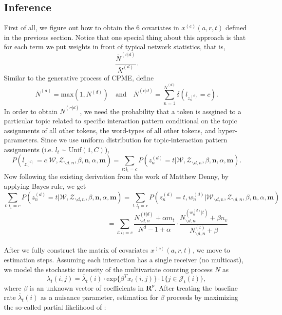 \documentclass[a4paper]{article}
\begin{document}
\subsection{Inference}
First of all, we figure out how to obtain the 6 covariates in $x^{(c)}(a, r, t)$ defined in the previous section. Notice that one special thing about this approach is that for each term we put weights in front of typical network statistics, that is, $$\frac{\bar N^{(c|d)}}{\bar N^{(d)}}.$$
Similar to the generative process of CPME, define $$\bar N^{(d)}=\mbox{max}(1, N^{(d)})\quad\mbox{and}\quad \bar N^{(c|d)}=\sum_{n=1}^{\bar N^{(d)}}\delta(l_{z_n^{(d)}}=c).$$
In order to obtain $\bar N^{(c|d)}$, we need the probability that a token is assgined to a particular topic related to specific interaction pattern conditional on the topic assignments of all other tokens, the word-types of all other tokens, and hyper-parameters. Since we use uniform distribution for topic-interaction pattern assignments (i.e. $l_t \sim \mbox{Unif}(1, C)$), 
$$P(l_{z_n^{(d)}}=c|\mathcal{W}, \mathcal{Z}_{\backslash d, n}, \beta, \boldsymbol{n}, \alpha, \boldsymbol{m})=\sum\limits_{t:l_t=c}P({z_n^{(d)}}=t | \mathcal{W}, \mathcal{Z}_{\backslash d, n}, \beta, \boldsymbol{n}, \alpha, \boldsymbol{m}).$$ 
Now following the existing derivation from the work of Matthew Denny, by applying Bayes rule, we get $$\sum\limits_{t:l_t=c}P({z_n^{(d)}}=t | \mathcal{W}, \mathcal{Z}_{\backslash d, n}, \beta, \boldsymbol{n}, \alpha, \boldsymbol{m})=\sum\limits_{t:l_t=c}P({z_n^{(d)}}=t, w_n^{(d)} | \mathcal{W}_{\backslash d, n}, \mathcal{Z}_{\backslash d, n}, \beta, \boldsymbol{n}, \alpha, \boldsymbol{m})$$
$$\quad\quad\quad\quad\quad\quad\quad\quad\quad\quad\quad\quad=\sum\limits_{t:l_t=c} \frac{N_{\backslash d, n}^{(t|d)}+\alpha m_t}{N^{d}-1+\alpha}\cdot \frac{N_{\backslash d, n}^{(w_n^{(d)}|t)}+\beta n_v}{N_{\backslash d, n}^{(t)}+\beta} $$\\\newline
After we fully construct the matrix of covariates $x^{(c)}(a, r, t)$, we move to estimation steps. Assuming each interaction has a single receiver (no multicast), we model the stochastic intensity of the multivariate counting process $N$ as \begin{equation}\lambda_t(i,j)=\bar\lambda_t(i)\cdot \mbox{exp}\{\beta^Tx_t(i, j)\}\cdot 1\{j \in \mathcal{J}_t(i)\},
\end{equation} 
where $\beta$ is an unknown vector of coefficients in $\boldsymbol{R}^{p}$. After treating the baseline rate $\bar\lambda_t(i)$ as a nuisance parameter, estimation for $\beta$ proceeds by maximizing the so-called partial likelihood of \cite{cox1992regression}: 
\end{document}
